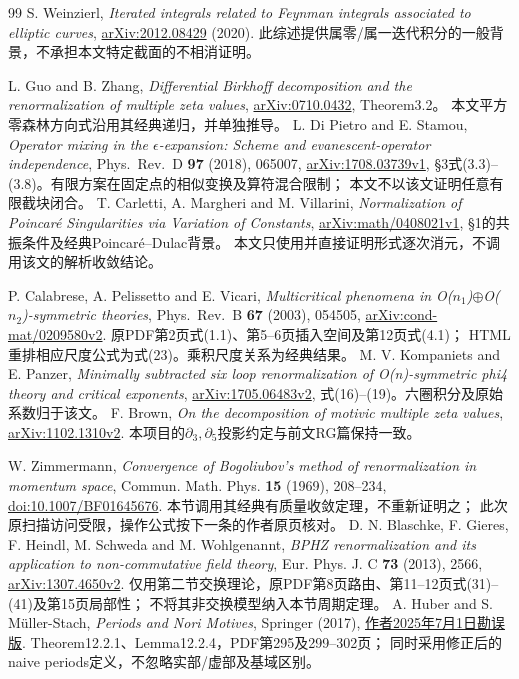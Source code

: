 \documentclass[11pt,a4paper]{ctexart}
\theoremstyle{cnplain}\newtheorem{theorem}{定理}[section]
\theoremstyle{definition}\newtheorem{definition}[theorem]{定义}
\theoremstyle{remark}\newtheorem{remark}[theorem]{注}
\begin{document}
\begin{thebibliography}{99}
 S. Weinzierl,
\emph{Iterated integrals related to Feynman integrals associated to elliptic curves},
\href{https://arxiv.org/abs/2012.08429}{arXiv:2012.08429} (2020).
此综述提供属零/属一迭代积分的一般背景，不承担本文特定截面的不相消证明。

 L. Guo and B. Zhang,
\emph{Differential Birkhoff decomposition and the renormalization of multiple zeta values},
\href{https://arxiv.org/abs/0710.0432}{arXiv:0710.0432}, Theorem3.2。
本文平方零森林方向式沿用其经典递归，并单独推导。
 L. Di Pietro and E. Stamou,
\emph{Operator mixing in the $\epsilon$-expansion: Scheme and evanescent-operator independence},
Phys.\ Rev.\ D \textbf{97} (2018), 065007,
\href{https://arxiv.org/abs/1708.03739}{arXiv:1708.03739v1},
\S3式(3.3)--(3.8)。有限方案在固定点的相似变换及算符混合限制；
本文不以该文证明任意有限截块闭合。
 T. Carletti, A. Margheri and M. Villarini,
\emph{Normalization of Poincar\'e Singularities via Variation of Constants},
\href{https://arxiv.org/abs/math/0408021}{arXiv:math/0408021v1},
\S1的共振条件及经典Poincar\'e--Dulac背景。
本文只使用并直接证明形式逐次消元，不调用该文的解析收敛结论。

 P. Calabrese, A. Pelissetto and E. Vicari,
\emph{Multicritical phenomena in O($n_1$)$\oplus$O($n_2$)-symmetric theories},
Phys.\ Rev.\ B \textbf{67} (2003), 054505,
\href{https://arxiv.org/abs/cond-mat/0209580}{arXiv:cond-mat/0209580v2}.
原PDF第2页式(1.1)、第5--6页插入空间及第12页式(4.1)；
HTML重排相应尺度公式为式(23)。乘积尺度关系为经典结果。
 M. V. Kompaniets and E. Panzer,
\emph{Minimally subtracted six loop renormalization of O(n)-symmetric phi4 theory
and critical exponents},
\href{https://arxiv.org/abs/1705.06483}{arXiv:1705.06483v2},
式(16)--(19)。六圈积分及原始系数归于该文。
 F. Brown, \emph{On the decomposition of motivic multiple zeta values},
\href{https://arxiv.org/abs/1102.1310}{arXiv:1102.1310v2}.
本项目的$\partial_3,\partial_5$投影约定与前文RG篇保持一致。


 W. Zimmermann,
\emph{Convergence of Bogoliubov's method of renormalization in momentum space},
Commun. Math. Phys. \textbf{15} (1969), 208--234,
\href{https://doi.org/10.1007/BF01645676}{doi:10.1007/BF01645676}.
本节调用其经典有质量收敛定理，不重新证明之；
此次原扫描访问受限，操作公式按下一条的作者原页核对。
 D. N. Blaschke, F. Gieres, F. Heindl, M. Schweda and M. Wohlgenannt,
\emph{BPHZ renormalization and its application to non-commutative field theory},
Eur. Phys. J. C \textbf{73} (2013), 2566,
\href{https://arxiv.org/abs/1307.4650}{arXiv:1307.4650v2}.
仅用第二节交换理论，原PDF第8页路由、第11--12页式(31)--(41)及第15页局部性；
不将其非交换模型纳入本节周期定理。
 A. Huber and S. M\"uller-Stach,
\emph{Periods and Nori Motives}, Springer (2017),
\href{https://home.mathematik.uni-freiburg.de/arithgeom/preprints/buch-errata/buch-errata.pdf}{作者2025年7月1日勘误版}.
Theorem12.2.1、Lemma12.2.4，PDF第295及299--302页；
同时采用修正后的naive periods定义，不忽略实部/虚部及基域区别。


\end{thebibliography}
\end{document}
